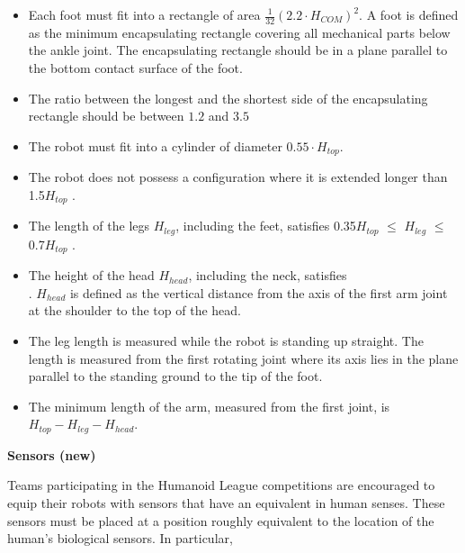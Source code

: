 \begin{itemize}
\item Each foot must fit into a rectangle of area $\tfrac{1}{32} (2.2 \cdot H_{COM})^2$.
      A foot is defined as the minimum encapsulating rectangle covering all
      mechanical parts below the ankle joint.
      The encapsulating rectangle should be in a plane parallel to the bottom
      contact surface of the foot.
\item The ratio between the longest and the shortest side of the encapsulating
      rectangle should be between $1.2$ and $3.5$
\item The robot must fit into a cylinder of diameter $0.55 \cdot H_{top}$.
\item The robot does not possess a configuration where it is extended longer than 1.5{\textperiodcentered}$H_{top}$ .
\item The length of the legs $H_{leg}$, including the feet, satisfies 0.35{\textperiodcentered}$H_{top}$ ${\leq}$ $H_{leg}$ ${\leq}$ 0.7{\textperiodcentered}$H_{top}$ .
\item The height of the head $H_{head}$, including the neck,
  satisfies \\
  .
  $H_{head}$ is defined as the vertical distance from the axis of the first arm
  joint at the shoulder to the top of the head.
\item The leg length is measured while the robot is standing up straight. The length is measured from the first rotating joint where its axis lies in the plane parallel to the standing ground to the tip of the foot.
\item The minimum length of the arm, measured from the first joint, is $H_{top} - H_{leg} - H_{head}$.
\end{itemize}


{\bfseries Sensors (new)}

\headlinebox

Teams participating in the Humanoid League competitions are encouraged to equip their robots with sensors that have an equivalent in human senses. These sensors must be placed at a position roughly equivalent to the location of the human{\textquoteright}s biological sensors. In particular, 

